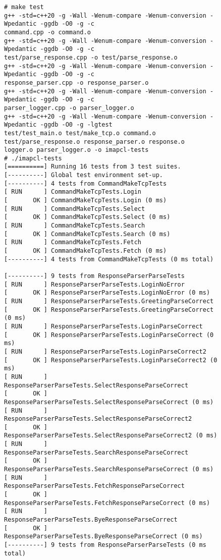 \documentclass[a4]{report}
\begin{document}
\begin{figure}
\begin{verbatim}
# make test
g++ -std=c++20 -g -Wall -Wenum-compare -Wenum-conversion -Wpedantic -ggdb -O0 -g -c
command.cpp -o command.o
g++ -std=c++20 -g -Wall -Wenum-compare -Wenum-conversion -Wpedantic -ggdb -O0 -g -c
test/parse_response.cpp -o test/parse_response.o
g++ -std=c++20 -g -Wall -Wenum-compare -Wenum-conversion -Wpedantic -ggdb -O0 -g -c
response_parser.cpp -o response_parser.o
g++ -std=c++20 -g -Wall -Wenum-compare -Wenum-conversion -Wpedantic -ggdb -O0 -g -c
parser_logger.cpp -o parser_logger.o
g++ -std=c++20 -g -Wall -Wenum-compare -Wenum-conversion -Wpedantic -ggdb -O0 -g -lgtest
test/test_main.o test/make_tcp.o command.o test/parse_response.o response_parser.o response.o
logger.o parser_logger.o -o imapcl-tests
# ./imapcl-tests
[==========] Running 16 tests from 3 test suites.
[----------] Global test environment set-up.
[----------] 4 tests from CommandMakeTcpTests
[ RUN      ] CommandMakeTcpTests.Login
[       OK ] CommandMakeTcpTests.Login (0 ms)
[ RUN      ] CommandMakeTcpTests.Select
[       OK ] CommandMakeTcpTests.Select (0 ms)
[ RUN      ] CommandMakeTcpTests.Search
[       OK ] CommandMakeTcpTests.Search (0 ms)
[ RUN      ] CommandMakeTcpTests.Fetch
[       OK ] CommandMakeTcpTests.Fetch (0 ms)
[----------] 4 tests from CommandMakeTcpTests (0 ms total)

[----------] 9 tests from ResponseParserParseTests
[ RUN      ] ResponseParserParseTests.LoginNoError
[       OK ] ResponseParserParseTests.LoginNoError (0 ms)
[ RUN      ] ResponseParserParseTests.GreetingParseCorrect
[       OK ] ResponseParserParseTests.GreetingParseCorrect (0 ms)
[ RUN      ] ResponseParserParseTests.LoginParseCorrect
[       OK ] ResponseParserParseTests.LoginParseCorrect (0 ms)
[ RUN      ] ResponseParserParseTests.LoginParseCorrect2
[       OK ] ResponseParserParseTests.LoginParseCorrect2 (0 ms)
[ RUN      ] ResponseParserParseTests.SelectResponseParseCorrect
[       OK ] ResponseParserParseTests.SelectResponseParseCorrect (0 ms)
[ RUN      ] ResponseParserParseTests.SelectResponseParseCorrect2
[       OK ] ResponseParserParseTests.SelectResponseParseCorrect2 (0 ms)
[ RUN      ] ResponseParserParseTests.SearchResponseParseCorrect
[       OK ] ResponseParserParseTests.SearchResponseParseCorrect (0 ms)
[ RUN      ] ResponseParserParseTests.FetchResponseParseCorrect
[       OK ] ResponseParserParseTests.FetchResponseParseCorrect (0 ms)
[ RUN      ] ResponseParserParseTests.ByeResponseParseCorrect
[       OK ] ResponseParserParseTests.ByeResponseParseCorrect (0 ms)
[----------] 9 tests from ResponseParserParseTests (0 ms total)


\end{verbatim}
\end{figure}
\end{document}
